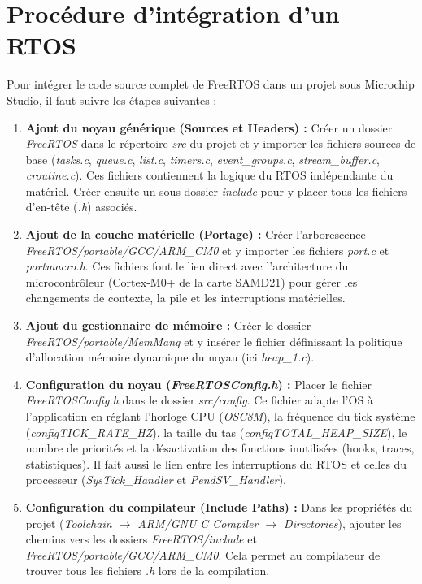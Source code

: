 \section{Procédure d'intégration d'un RTOS}

Pour intégrer le code source complet de FreeRTOS dans un projet sous Microchip Studio, il faut suivre les étapes suivantes :

\begin{enumerate}
    \item \textbf{Ajout du noyau générique (Sources et Headers) :} 
    Créer un dossier \textit{FreeRTOS} dans le répertoire \textit{src} du projet et y importer les fichiers sources de base (\textit{tasks.c}, \textit{queue.c}, \textit{list.c}, \textit{timers.c}, \textit{event\_groups.c}, \textit{stream\_buffer.c}, \textit{croutine.c}). Ces fichiers contiennent la logique du RTOS indépendante du matériel. Créer ensuite un sous-dossier \textit{include} pour y placer tous les fichiers d'en-tête (\textit{.h}) associés. \\

    \item \textbf{Ajout de la couche matérielle (Portage) :} 
    Créer l'arborescence \textit{FreeRTOS/\allowbreak portable/\allowbreak GCC/\allowbreak ARM\_CM0} et y importer les fichiers \textit{port.c} et \textit{portmacro.h}. Ces fichiers font le lien direct avec l'architecture du microcontrôleur (Cortex-M0+ de la carte SAMD21) pour gérer les changements de contexte, la pile et les interruptions matérielles. \\

    \item \textbf{Ajout du gestionnaire de mémoire :} 
    Créer le dossier \textit{FreeRTOS/\allowbreak portable/\allowbreak MemMang} et y insérer le fichier définissant la politique d'allocation mémoire dynamique du noyau (ici \textit{heap\_1.c}). \\

    \item \textbf{Configuration du noyau (\textit{FreeRTOSConfig.h}) :}
    Placer le fichier \textit{FreeRTOSConfig.h} dans le dossier \textit{src/config}. Ce fichier adapte l'OS à l'application en réglant l'horloge CPU (\textit{OSC8M}), la fréquence du tick système (\textit{configTICK\_RATE\_HZ}), la taille du tas (\textit{configTOTAL\_HEAP\_SIZE}), le nombre de priorités et la désactivation des fonctions inutilisées (hooks, traces, statistiques). Il fait aussi le lien entre les interruptions du RTOS et celles du processeur (\textit{SysTick\_Handler} et \textit{PendSV\_Handler}). \\

    \item \textbf{Configuration du compilateur (Include Paths) :} 
    Dans les propriétés du projet (\textit{Toolchain $\rightarrow$ ARM/GNU C Compiler $\rightarrow$ Directories}), ajouter les chemins vers les dossiers \textit{FreeRTOS/\allowbreak include} et \textit{FreeRTOS/\allowbreak portable/\allowbreak GCC/\allowbreak ARM\_CM0}. Cela permet au compilateur de trouver tous les fichiers \textit{.h} lors de la compilation.
\end{enumerate}
